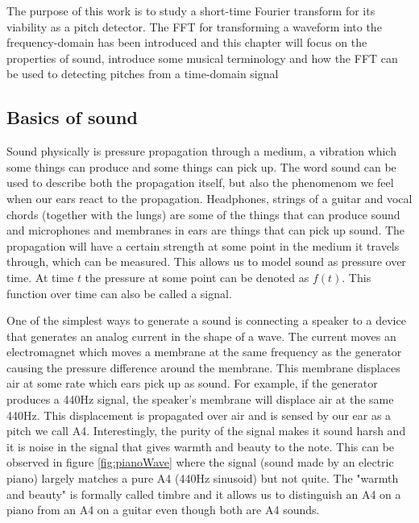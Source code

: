 The purpose of this work is to study a short-time Fourier transform for its viability as a pitch detector. The FFT for transforming a waveform into the frequency-domain has been introduced and this chapter will focus on the properties of sound, introduce some musical terminology and how the FFT can be used to detecting pitches from a time-domain signal

\subsection{Basics of sound}
Sound physically is pressure propagation through a medium, a vibration which some things can produce and some things can pick up. The word sound can be used to describe both the propagation itself, but also the phenomenom we feel when our ears react to the propagation. Headphones, strings of a guitar and vocal chords (together with the lungs) are some of the things that can produce sound and microphones and membranes in ears are things that can pick up sound. The propagation will have a certain strength at some point in the medium it travels through, which can be measured. This allows us to model sound as pressure over time. At time $t$ the pressure at some point can be denoted as $f(t)$. This function over time can also be called a signal.


One of the simplest ways to generate a sound is connecting a speaker to a device that generates an analog current in the shape of a wave. The current moves an electromagnet which moves a membrane at the same frequency as the generator causing the pressure difference around the membrane. This membrane displaces air at some rate which ears pick up as sound. For example, if the generator produces a 440Hz signal, the speaker's membrane will displace air at the same 440Hz. This displacement is propagated over air and is sensed by our ear as a pitch we call A4. Interestingly, the purity of the signal makes it sound harsh and it is noise in the signal that gives warmth and beauty to the note. This can be observed in figure \ref{fig:pianoWave} where the signal (sound made by an electric piano) largely matches a pure A4 (440Hz sinusoid) but not quite. The "warmth and beauty" is formally called timbre and it allows us to distinguish an A4 on a piano from an A4 on a guitar even though both are A4 sounds.

